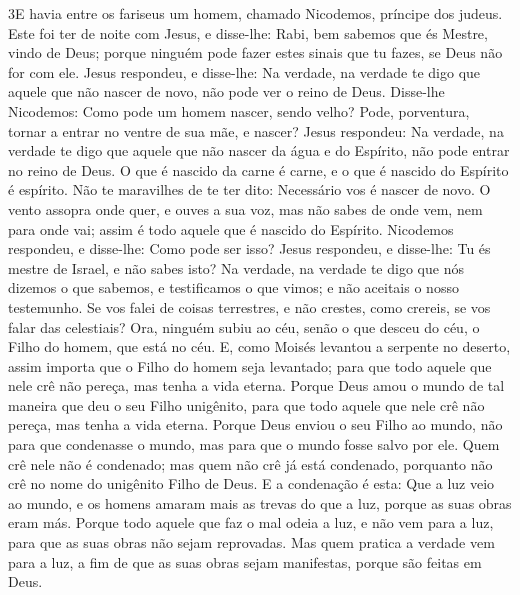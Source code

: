 \medskip

\lettrine{3} E havia entre os fariseus um homem, chamado
Nicodemos, príncipe dos judeus. Este foi ter de noite com Jesus,
e disse-lhe: Rabi, bem sabemos que és Mestre, vindo de Deus; porque
ninguém pode fazer estes sinais que tu fazes, se Deus não for com
ele. Jesus respondeu, e disse-lhe: Na verdade, na verdade te
digo que aquele que não nascer de novo, não pode ver o reino de
Deus. Disse-lhe Nicodemos: Como pode um homem nascer, sendo
velho? Pode, porventura, tornar a entrar no ventre de sua mãe, e
nascer? Jesus respondeu: Na verdade, na verdade te digo que
aquele que não nascer da água e do Espírito, não pode entrar no
reino de Deus. O que é nascido da carne é carne, e o que é
nascido do Espírito é espírito. Não te maravilhes de te ter
dito: Necessário vos é nascer de novo. O vento assopra onde
quer, e ouves a sua voz, mas não sabes de onde vem, nem para onde
vai; assim é todo aquele que é nascido do Espírito. Nicodemos
respondeu, e disse-lhe: Como pode ser isso? Jesus respondeu,
e disse-lhe: Tu és mestre de Israel, e não sabes isto? Na
verdade, na verdade te digo que nós dizemos o que sabemos, e
testificamos o que vimos; e não aceitais o nosso testemunho.
Se vos falei de coisas terrestres, e não crestes, como
crereis, se vos falar das celestiais? Ora, ninguém subiu ao
céu, senão o que desceu do céu, o Filho do homem, que está no céu.
E, como Moisés levantou a serpente no deserto, assim importa
que o Filho do homem seja levantado; para que todo aquele que
nele crê não pereça, mas tenha a vida eterna. Porque Deus
amou o mundo de tal maneira que deu o seu Filho unigênito, para que
todo aquele que nele crê não pereça, mas tenha a vida eterna.
Porque Deus enviou o seu Filho ao mundo, não para que
condenasse o mundo, mas para que o mundo fosse salvo por ele.
Quem crê nele não é condenado; mas quem não crê já está
condenado, porquanto não crê no nome do unigênito Filho de Deus.
E a condenação é esta: Que a luz veio ao mundo, e os homens
amaram mais as trevas do que a luz, porque as suas obras eram más.
Porque todo aquele que faz o mal odeia a luz, e não vem para
a luz, para que as suas obras não sejam reprovadas. Mas quem
pratica a verdade vem para a luz, a fim de que as suas obras sejam
manifestas, porque são feitas em Deus.

